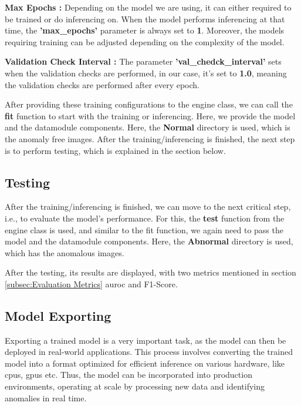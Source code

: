\textbf{Max Epochs :} Depending on the model we are using, it can either required to be trained or do inferencing on. When the model performs inferencing at that time, the \textbf{'max\_epochs'} parameter is always set to \textbf{1}. Moreover, the models requiring training can be adjusted depending on the complexity of the model.%

\textbf{Validation Check Interval :} The parameter \textbf{'val\_chedck\_interval'} sets when the validation checks are performed, in our case, it's set to \textbf{1.0}, meaning the validation checks are performed after every epoch.

After providing these training configurations to the engine class, we can call the \textbf{fit} function to start with the training or inferencing. Here, we provide the model and the datamodule components. Here, the \textbf{Normal} directory is used, which is the anomaly free images. After the training/inferencing is finished, the next step is to perform testing, which is explained in the section below.

\subsection{Testing}

After the training/inferencing is finished, we can move to the next critical step, i.e., to evaluate the model's performance. For this, the \textbf{test} function from the engine class is used, and similar to the fit function, we again need to pass the model and the datamodule components. Here, the \textbf{Abnormal} directory is used, which has the anomalous images. 

After the testing, its results are displayed, with two metrics mentioned in section \ref{subsec:Evaluation Metrics} \gls{auroc} and F1-Score.

\subsection{Model Exporting}
\label{subsec:Model Exporting}

Exporting a trained model is a very important task, as the model can then be deployed in real-world applications. This process involves converting the trained model into a format optimized for efficient inference on various hardware, like \glspl{cpu}, \glspl{gpu} etc. Thus, the model can be incorporated into production environments, operating at scale by processing new data and identifying anomalies in real time.

